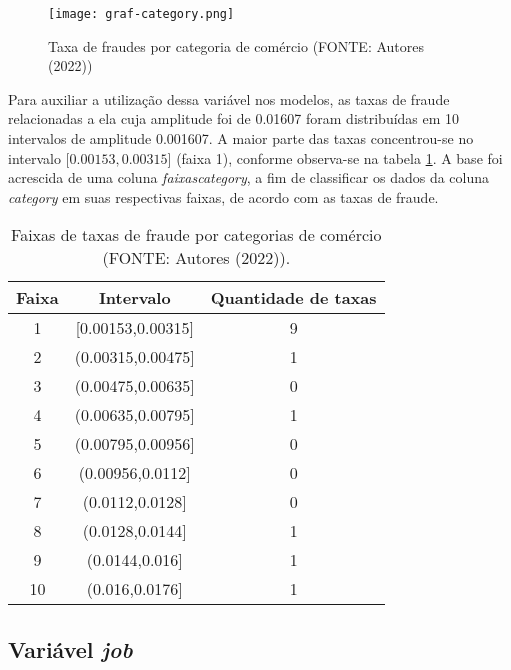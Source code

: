 \documentclass{article}
\begin{document}
\begin{figure}[!ht]
    \centering
    \texttt{[image: graf-category.png]}
    \caption{Taxa de fraudes por categoria de comércio (FONTE: Autores (2022))}
    \label{graf-category}
\end{figure}

\newpage
Para auxiliar a utilização dessa variável nos modelos, as taxas de fraude relacionadas a ela cuja amplitude foi de 0.01607 foram distribuídas em 10 intervalos de amplitude 0.001607. A maior parte das taxas concentrou-se no intervalo ${[}0.00153,0.00315{]}$ (faixa 1), conforme observa-se na tabela \ref{tab-category}. A base foi acrescida de uma coluna \textit{faixascategory}, a fim de classificar os dados da coluna \textit{category} em suas respectivas faixas, de acordo com as taxas de fraude.

\begin{table}[!ht]
\centering
\begin{tabular}{ccc}
Faixa & Intervalo             & Quantidade de taxas \\ \hline
1     & {[}0.00153,0.00315{]} & 9                   \\
2     & (0.00315,0.00475{]}   & 1                   \\
3     & (0.00475,0.00635{]}   & 0                   \\
4     & (0.00635,0.00795{]}   & 1                   \\
5     & (0.00795,0.00956{]}   & 0                   \\
6     & (0.00956,0.0112{]}    & 0                   \\
7     & (0.0112,0.0128{]}     & 0                   \\
8     & (0.0128,0.0144{]}     & 1                   \\
9     & (0.0144,0.016{]}      & 1                   \\
10    & (0.016,0.0176{]}      & 1                  
\end{tabular}
\caption{Faixas de taxas de fraude por categorias de comércio (FONTE: Autores (2022)).}
\label{tab-category}
\end{table}


\subsection{Variável \textit{job}}
\end{document}
